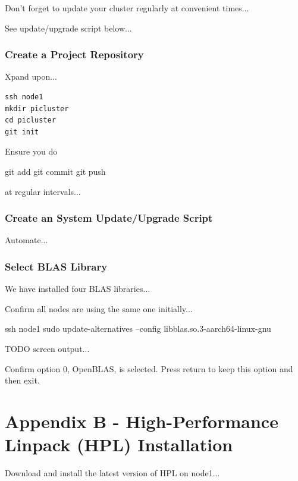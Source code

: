 \documentclass{article}
\begin{document}
Don't forget to update your cluster regularly at convenient times...

See update/upgrade script below...



\subsubsection{Create a Project Repository}

Xpand upon...

\lstset{frameround=tttt}
\begin{lstlisting}[frame=single]
ssh node1
mkdir picluster
cd picluster
git init
\end{lstlisting}

Ensure you do  

git add
git commit
git push

at regular intervals...



\subsubsection{Create an System Update/Upgrade Script}

Automate...

\lstset{frameround=tttt}




\subsubsection{Select BLAS Library}

We have installed four BLAS libraries...

Confirm all nodes are using the same one initially...

ssh node1
sudo update-alternatives --config libblas.so.3-aarch64-linux-gnu

TODO screen output...

Confirm option 0, OpenBLAS, is selected. Press return to keep this option and then exit.



%
%
\clearpage\section{Appendix B - High-Performance Linpack (HPL) Installation}

Download and install the latest version of HPL on node1...
\end{document}
